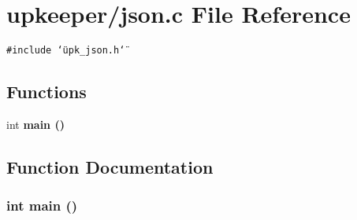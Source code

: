 \section{upkeeper/json.c File Reference}
\label{json_8c}
{\tt \#include \char`\"{}upk\_\-json.h\char`\"{}}\par
\subsection*{Functions}
\begin{CompactItemize}
\item 
int \bf{main} ()
\end{CompactItemize}


\subsection{Function Documentation}
\subsubsection{\setlength{\rightskip}{0pt plus 5cm}int main ()}\label{json_8c_446c6b9a1a4dbab517fbb760870458a3}


